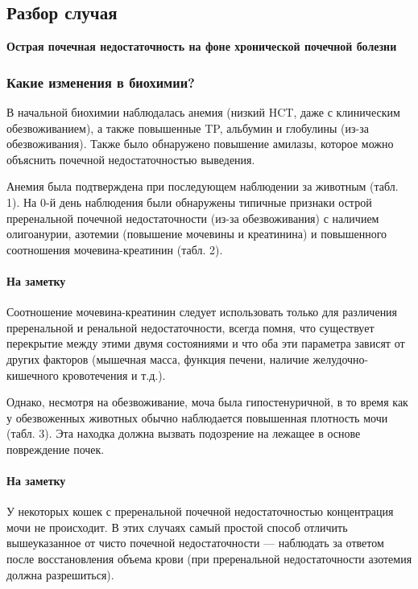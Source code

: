 \documentclass[a4paper,12pt]{book}
\begin{document}
\subsection*{Разбор случая}
\textbf{Острая почечная недостаточность на фоне хронической почечной болезни}

\subsubsection*{Какие изменения в биохимии?}
В начальной биохимии наблюдалась анемия (низкий HCT, даже с клиническим обезвоживанием), а также повышенные TP, альбумин и глобулины (из-за обезвоживания). Также было обнаружено повышение амилазы, которое можно объяснить почечной недостаточностью выведения.

Анемия была подтверждена при последующем наблюдении за животным (табл. 1). На 0-й день наблюдения были обнаружены типичные признаки острой преренальной почечной недостаточности (из-за обезвоживания) с наличием олигоанурии, азотемии (повышение мочевины и креатинина) и повышенного соотношения мочевина-креатинин (табл. 2).

\paragraph{На заметку}
Соотношение мочевина-креатинин следует использовать только для различения преренальной и ренальной недостаточности, всегда помня, что существует перекрытие между этими двумя состояниями и что оба эти параметра зависят от других факторов (мышечная масса, функция печени, наличие желудочно-кишечного кровотечения и т.д.).

Однако, несмотря на обезвоживание, моча была гипостенуричной, в то время как у обезвоженных животных обычно наблюдается повышенная плотность мочи (табл. 3). Эта находка должна вызвать подозрение на лежащее в основе повреждение почек.

\paragraph{На заметку}
У некоторых кошек с преренальной почечной недостаточностью концентрация мочи не происходит. В этих случаях самый простой способ отличить вышеуказанное от чисто почечной недостаточности — наблюдать за ответом после восстановления объема крови (при преренальной недостаточности азотемия должна разрешиться).
\end{document}
